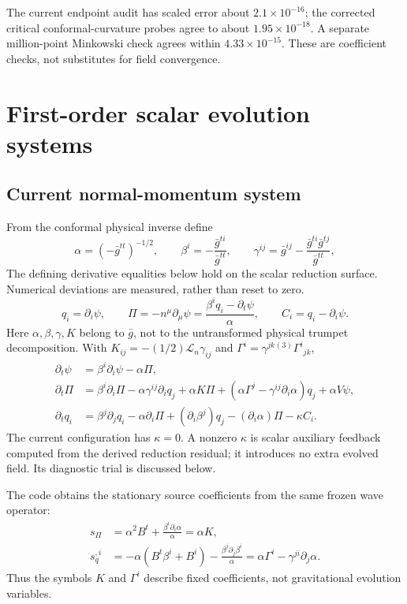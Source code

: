 \documentclass[11pt,letterpaper]{article}
\newcommand{\G}{\bar g}
\begin{document}
The current endpoint audit has scaled error about $2.1\times10^{-16}$; the corrected critical conformal-curvature probes agree to about $1.95\times10^{-18}$. A separate million-point Minkowski check agrees within $4.33\times10^{-15}$. These are coefficient checks, not substitutes for field convergence.

\clearpage
\section{First-order scalar evolution systems}
\subsection{Current normal-momentum system}
From the conformal physical inverse define
\begin{equation}
 \alpha=(-\G^{tt})^{-1/2},\qquad \beta^i=-\frac{\G^{ti}}{\G^{tt}},\qquad
 \gamma^{ij}=\G^{ij}-\frac{\G^{ti}\G^{tj}}{\G^{tt}},
\end{equation}
The defining derivative equalities below hold on the scalar reduction surface. Numerical deviations are measured, rather than reset to zero.
\begin{equation}
 q_i=\partial_i\psi,\qquad \Pi=-n^\mu\partial_\mu\psi
 =\frac{\beta^iq_i-\partial_t\psi}{\alpha},\qquad C_i=q_i-\partial_i\psi.
\end{equation}
Here $\alpha,\beta,\gamma,K$ belong to $\G$, not to the untransformed physical trumpet decomposition. With $K_{ij}=-(1/2)\mathcal L_n\gamma_{ij}$ and $\Gamma^i=\gamma^{jk}{}^{(3)}\Gamma^i{}_{jk}$,
\begin{align}\label{eq:normal}
 \partial_t\psi&=\beta^i\partial_i\psi-\alpha\Pi,\\
 \partial_t\Pi&=\beta^i\partial_i\Pi-\alpha\gamma^{ij}\partial_iq_j
 +\alpha K\Pi+(\alpha\Gamma^j-\gamma^{ij}\partial_i\alpha)q_j+\alpha V\psi,\\
 \partial_tq_i&=\beta^j\partial_jq_i-\alpha\partial_i\Pi
 +(\partial_i\beta^j)q_j-(\partial_i\alpha)\Pi-\kappa C_i.
\end{align}
The current configuration has $\kappa=0$. A nonzero $\kappa$ is scalar auxiliary feedback computed from the derived reduction residual; it introduces no extra evolved field. Its diagnostic trial is discussed below.

The code obtains the stationary source coefficients from the same frozen wave operator:
\begin{align}
 s_\Pi&=\alpha^2B^t+\frac{\beta^i\partial_i\alpha}{\alpha}=\alpha K,\\
 s_q^{,i}&=-\alpha(B^t\beta^i+B^i)
 -\frac{\beta^j\partial_j\beta^i}{\alpha}
 =\alpha\Gamma^i-\gamma^{ji}\partial_j\alpha.
\end{align}
Thus the symbols $K$ and $\Gamma^i$ describe fixed coefficients, not gravitational evolution variables.
\end{document}
